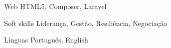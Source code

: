 \begin{cvskills}
\cvskill
{Web} %
{HTML5, Composer, Laravel} %


\cvskill
{Soft skills} %
{Liderança, Gestão, Resiliência, Negociação} %


\cvskill
{Línguas} %
{Português, English} %


\end{cvskills}
